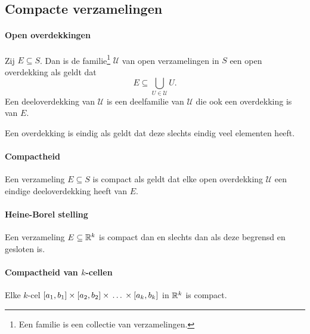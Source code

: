 \subsection{Compacte verzamelingen}
\paragraph{Open overdekkingen} Zij \(E\subseteq S\). Dan is de familie\footnote{Een familie is een collectie van verzamelingen.} \(\mathcal{U}\) van open verzamelingen in \(S\) een open overdekking als geldt dat
\[
    E\subseteq\bigcup\limits_{U\in\mathcal{U}}U.
\]
Een deeloverdekking van \(\mathcal{U}\) is een deelfamilie van \(\mathcal{U}\) die ook een overdekking is van \(E\).

Een overdekking is eindig als geldt dat deze slechts eindig veel elementen heeft.

\paragraph{Compactheid} Een verzameling \(E\subseteq S\) is compact als geldt dat elke open overdekking \(\mathcal{U}\) een eindige deeloverdekking heeft van \(E\).

\paragraph{Heine-Borel stelling} Een verzameling \(E\subseteq \mathbb{R}^{k}\) is compact dan en slechts dan als deze begrensd en gesloten is.

\paragraph{Compactheid van \(k\)-cellen} Elke \(k\)-cel \([a_{1},b_{1}]\times[a_{2},b_{2}]\times\,\dots\,\times[a_{k},b_{k}]\) in \(\mathbb{R}^{k}\) is compact.